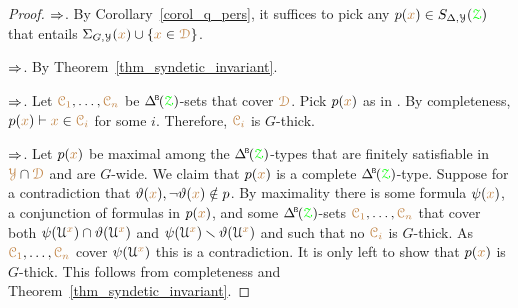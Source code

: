 \begin{proof}
  $\Rightarrow$.
  By Corollary~\ref{corol_q_pers}, it suffices to pick any $p({\color{brown} x})\in S_{\Delta,\EuScript Y}({\color{green}\EuScript Z})$ that entails $\Sigma_{G,\EuScript Y}({\color{brown} x})\cup\{{\color{brown} x}\in{\color{brown}\EuScript D}\}$.

  $\Rightarrow$.
  By Theorem~\ref{thm_syndetic_invariant}.

  $\Rightarrow$.
  Let ${\color{brown}\EuScript C_1},\dots,{\color{brown}\EuScript C_n}$ be $\BDelta({\grZ})$-sets that cover ${\color{brown}\EuScript D}$.
  Pick $p({\color{brown} x})$ as in .
  By completeness, $p({\color{brown} x})\vdash {\color{brown}x}\in{\color{brown}\EuScript C_i}$ for some $i$.
  Therefore, ${\color{brown}\EuScript C_i}$ is $G$-thick.

  $\Rightarrow$.
  Let $p({\color{brown} x})$ be maximal among the $\BDelta({\grZ})$-types that are finitely satisfiable in ${\color{brown}\EuScript Y}\cap{\color{brown}\EuScript D}$ and are $G$-wide.
  We claim that $p({\color{brown} x})$ is a complete $\BDelta({\grZ})$-type.
  Suppose for a contradiction that $\vartheta({\color{brown} x}),\neg\vartheta({\color{brown} x})\notin p$.
  By maximality there is some formula $\psi({\color{brown} x})$, a conjunction of formulas in $p({\color{brown} x})$, and some $\BDelta({\grZ})$-sets ${\color{brown}\EuScript C_1},\dots,{\color{brown}\EuScript C_n}$ that cover both $\psi(\EuScript U^{\color{brown} x})\cap\vartheta(\EuScript U^{\color{brown} x})$ and $\psi(\EuScript U^{\color{brown} x})\smallsetminus\vartheta(\EuScript U^{\color{brown} x})$ and such that no ${\color{brown}\EuScript C_i}$ is $G$-thick.
  As ${\color{brown}\EuScript C_1},\dots,{\color{brown}\EuScript C_n}$ cover $\psi(\EuScript U^{\color{brown} x})$ this is a contradiction.
  It is only left to show that $p({\color{brown} x})$ is $G$-thick.
  This follows from completeness and Theorem~\ref{thm_syndetic_invariant}.
\end{proof}





